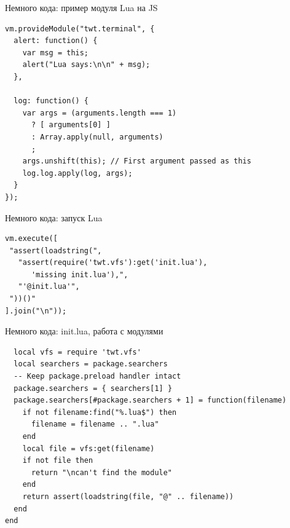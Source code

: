 \documentclass[aspectratio=169,handout,bigger]{beamer}
\begin{document}

\begin{frame}[fragile]{Немного кода: пример модуля Lua на JS}

\begin{verbatim}
vm.provideModule("twt.terminal", {
  alert: function() {
    var msg = this;
    alert("Lua says:\n\n" + msg);
  },

  log: function() {
    var args = (arguments.length === 1)
      ? [ arguments[0] ]
      : Array.apply(null, arguments)
      ;
    args.unshift(this); // First argument passed as this
    log.log.apply(log, args);
  }
});
\end{verbatim}

\end{frame}

\begin{frame}[fragile]{Немного кода: запуск Lua}

\begin{verbatim}
vm.execute([
 "assert(loadstring(",
   "assert(require('twt.vfs'):get('init.lua'),
      'missing init.lua'),",
   "'@init.lua'",
 "))()"
].join("\n"));
\end{verbatim}

\end{frame}


\begin{frame}[fragile]{Немного кода: init.lua, работа с модулями}

\begin{verbatim}
  local vfs = require 'twt.vfs'
  local searchers = package.searchers
  -- Keep package.preload handler intact
  package.searchers = { searchers[1] }
  package.searchers[#package.searchers + 1] = function(filename)
    if not filename:find("%.lua$") then
      filename = filename .. ".lua"
    end
    local file = vfs:get(filename)
    if not file then
      return "\ncan't find the module"
    end
    return assert(loadstring(file, "@" .. filename))
  end
end
\end{verbatim}

\end{frame}

\end{document}
